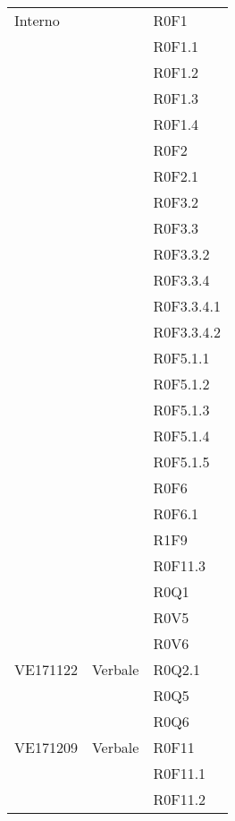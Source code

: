 \documentclass[AnalisiDeiRequisiti.tex]{subfiles}
\begin{document}
\begin{longtable}[H]{p{2cm}p{5cm}p{5cm}}
	Interno & & R0F1 \\
	& & R0F1.1 \\
	& & R0F1.2 \\
	& & R0F1.3 \\
	& & R0F1.4 \\
	& & R0F2 \\
	& & R0F2.1 \\
	& & R0F3.2 \\
	& & R0F3.3 \\
	& & R0F3.3.2 \\
	& & R0F3.3.4 \\
	& & R0F3.3.4.1 \\
	& & R0F3.3.4.2 \\
	& & R0F5.1.1 \\
	& & R0F5.1.2 \\
	& & R0F5.1.3 \\
	& & R0F5.1.4 \\
	& & R0F5.1.5 \\
	& & R0F6 \\
	& & R0F6.1 \\
	& & R1F9 \\
	& & R0F11.3 \\
	& & R0Q1 \\
	& & R0V5 \\
	& & R0V6 \\  
	
	VE171122 & Verbale & R0Q2.1 \\
	& & R0Q5 \\
	& & R0Q6 \\  
	
	VE171209 & Verbale & R0F11 \\
	& & R0F11.1 \\
	& & R0F11.2 \\  
	

\end{longtable}
\end{document}
